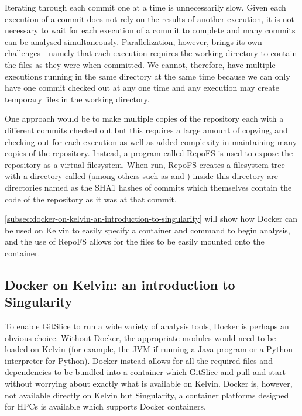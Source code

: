 \documentclass[11pt]{article}
\begin{document}
    Iterating through each commit one at a time is unnecessarily slow.
    Given each execution of a commit does not rely on the results of another execution, it is not necessary to wait for each execution of a commit to complete and many commits can be analysed simultaneously.
    Parallelization, however, brings its own challenges---namely that each execution requires the working directory to contain the files as they were when committed.
    We cannot, therefore, have multiple executions running in the same directory at the same time because we can only have one commit checked out at any one time and any execution may create temporary files in the working directory.

    One approach would be to make multiple copies of the repository each with a different commits checked out but this requires a large amount of copying, and checking out for each execution as well as added complexity in maintaining many copies of the repository.
    Instead, a program called RepoFS is used to expose the repository as a virtual filesystem.
    When run, RepoFS creates a filesystem tree with a directory called  (among others such as  and ) inside this directory are directories named as the SHA1 hashes of commits which themselves contain the code of the repository as it was at that commit.

    \autoref{subsec:docker-on-kelvin-an-introduction-to-singularity} will show how Docker can be used on Kelvin to easily specify a container and command to begin analysis, and the use of RepoFS allows for the files to be easily mounted onto the container.

    \subsection{Docker on Kelvin: an introduction to Singularity}\label{subsec:docker-on-kelvin-an-introduction-to-singularity}

    To enable GitSlice to run a wide variety of analysis tools, Docker is perhaps an obvious choice.
    Without Docker, the appropriate modules would need to be loaded on Kelvin (for example, the JVM if running a Java program or a Python interpreter for Python).
    Docker instead allows for all the required files and dependencies to be bundled into a container which GitSlice and pull and start without worrying about exactly what is available on Kelvin.
    Docker is, however, not available directly on Kelvin but Singularity, a container platforms designed for HPCs is available which supports Docker containers.
\end{document}
